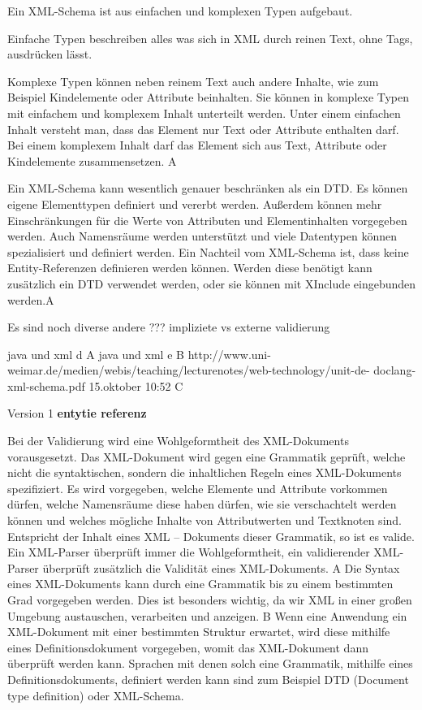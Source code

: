 Ein XML-Schema ist aus einfachen und komplexen Typen aufgebaut. 

Einfache Typen beschreiben alles was sich in XML durch reinen Text, ohne Tags, ausdrücken lässt.

Komplexe Typen können neben reinem Text auch andere Inhalte, wie zum Beispiel Kindelemente oder Attribute beinhalten. Sie können in komplexe Typen mit einfachem und komplexem Inhalt unterteilt werden. Unter einem einfachen Inhalt versteht man, dass das Element nur Text oder Attribute enthalten darf. Bei einem komplexem Inhalt darf das Element sich aus Text, Attribute oder Kindelemente zusammensetzen. A

Ein XML-Schema kann wesentlich genauer beschränken als ein DTD. Es können eigene Elementtypen definiert und vererbt werden. Außerdem können mehr Einschränkungen für die Werte von Attributen und Elementinhalten vorgegeben werden. Auch Namensräume werden unterstützt und viele Datentypen können spezialisiert und definiert werden. Ein Nachteil vom XML-Schema ist, dass keine Entity-Referenzen definieren werden können. Werden diese benötigt kann zusätzlich ein DTD verwendet werden, oder sie können mit XInclude eingebunden werden.A

Es sind noch diverse andere
??? impliziete vs externe validierung

java und xml d A
java und xml e B
http://www.uni-weimar.de/medien/webis/teaching/lecturenotes/web-technology/unit-de-
doclang-xml-schema.pdf 15.oktober 10:52 C

Version 1
\textbf{entytie referenz}

Bei der Validierung wird eine Wohlgeformtheit des XML-Dokuments vorausgesetzt. Das XML-Dokument wird gegen eine Grammatik geprüft, welche nicht die syntaktischen, sondern die inhaltlichen Regeln eines XML-Dokuments spezifiziert. Es wird vorgegeben, welche Elemente und Attribute vorkommen dürfen, welche Namensräume diese haben dürfen, wie sie verschachtelt werden können und welches mögliche Inhalte von Attributwerten und Textknoten sind. Entspricht der Inhalt eines XML – Dokuments dieser Grammatik, so ist es valide. Ein XML-Parser überprüft immer die Wohlgeformtheit, ein validierender XML-Parser überprüft zusätzlich die Validität eines XML-Dokuments. A
Die Syntax eines XML-Dokuments kann durch eine Grammatik bis zu einem bestimmten Grad vorgegeben werden. Dies ist besonders wichtig, da wir XML in einer großen Umgebung austauschen, verarbeiten und anzeigen. B Wenn eine Anwendung ein XML-Dokument mit einer bestimmten Struktur erwartet, wird diese mithilfe eines Definitionsdokument vorgegeben, womit das XML-Dokument dann überprüft werden kann.
Sprachen mit denen solch eine Grammatik, mithilfe eines Definitionsdokuments, definiert werden kann sind zum Beispiel DTD (Document type definition) oder XML-Schema.


